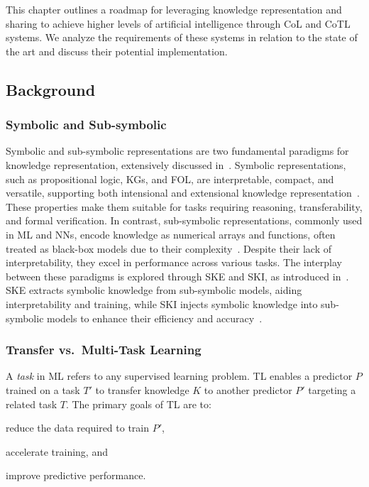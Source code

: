 This chapter outlines a roadmap for leveraging knowledge representation and sharing to achieve higher levels of artificial intelligence through \gls{CoL} and \gls{CoTL} systems.
%
We analyze the requirements of these systems in relation to the state of the art and discuss their potential implementation.
%

\subsection{Background}
\label{subsec:background}

\subsubsection{Symbolic and Sub-symbolic}
\label{subsubsec:symbolic-and-sub-symbolic}
%
Symbolic and sub-symbolic representations are two fundamental paradigms for knowledge representation, extensively discussed in~.
%
Symbolic representations, such as propositional logic, \glspl{KG}, and \gls{FOL}, are interpretable, compact, and versatile, supporting both intensional and extensional knowledge representation~\cite{DBLP:conf/ogai/Gelder90,DBLP:conf/aiia/CiattoCOC19}.
%
These properties make them suitable for tasks requiring reasoning, transferability, and formal verification.
%
In contrast, sub-symbolic representations, commonly used in \gls{ML} and \glspl{NN}, encode knowledge as numerical arrays and functions, often treated as black-box models due to their complexity~\cite{interpretability-lipton-2018}.
%
Despite their lack of interpretability, they excel in performance across various tasks.
%
The interplay between these paradigms is explored through \gls{SKE} and \gls{SKI}, as introduced in~.
%
\gls{SKE} extracts symbolic knowledge from sub-symbolic models, aiding interpretability and training, while \gls{SKI} injects symbolic knowledge into sub-symbolic models to enhance their efficiency and accuracy~\cite{survey-ske-andrews-1995,survey-ski-besold-2017}.
%

\subsubsection{Transfer vs.\ Multi-Task Learning}
\label{subsubsec:tl-mtl}
%
A \emph{task} in \gls{ML} refers to any supervised learning problem.
%
\Gls{TL} enables a predictor \(P\) trained on a task \(T'\) to transfer knowledge \(K\) to another predictor \(P'\) targeting a related task \(T\).
%
The primary goals of \gls{TL} are to:
%
\begin{inlinelist}
    \item reduce the data required to train \(P'\),
    \item accelerate training, and
    \item improve predictive performance.
\end{inlinelist}

